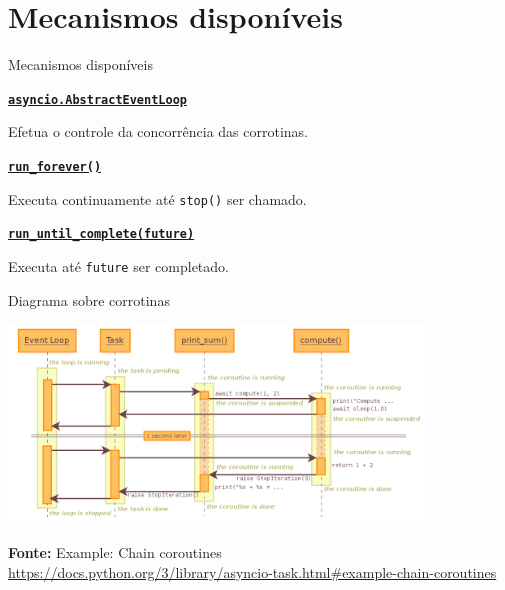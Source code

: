 \documentclass[12pt]{beamer}
\begin{document}
\section{Mecanismos disponíveis}

\begin{frame}[fragile]{Mecanismos disponíveis}
  \small{
  \textbf{\texttt{\href{https://docs.python.org/3/library/asyncio-eventloop.html}{asyncio.AbstractEventLoop}}}

  Efetua o controle da concorrência das corrotinas.\\\vspace{0.25cm}

  \textbf{\texttt{\href{https://docs.python.org/3/library/asyncio-eventloop.html\#asyncio.AbstractEventLoop.run\_forever}{run\_forever()}}}

  Executa continuamente até \texttt{stop()} ser chamado.\\\vspace{0.25cm}

  \textbf{\texttt{\href{https://docs.python.org/3/library/asyncio-eventloop.html\#asyncio.AbstractEventLoop.run\_until\_complete}{run\_until\_complete(future)}}}

  Executa até \texttt{future} ser completado.\\\vspace{0.25cm}
  }
\end{frame}

\begin{frame}{Diagrama sobre corrotinas}
  \begin{center}
    \vspace{-0.5cm}
    \href{https://docs.python.org/3/library/asyncio-task.html\#example-chain-coroutines}{\includegraphics[width=11cm]{tulip_coro}}
  \end{center}
  \begin{flushleft}
    \footnotesize{\vspace{-0.5cm}
                  \textbf{Fonte:} Example: Chain coroutines\\
                  \tiny{\url{https://docs.python.org/3/library/asyncio-task.html\#example-chain-coroutines}}}
  \end{flushleft}
\end{frame}
\end{document}
